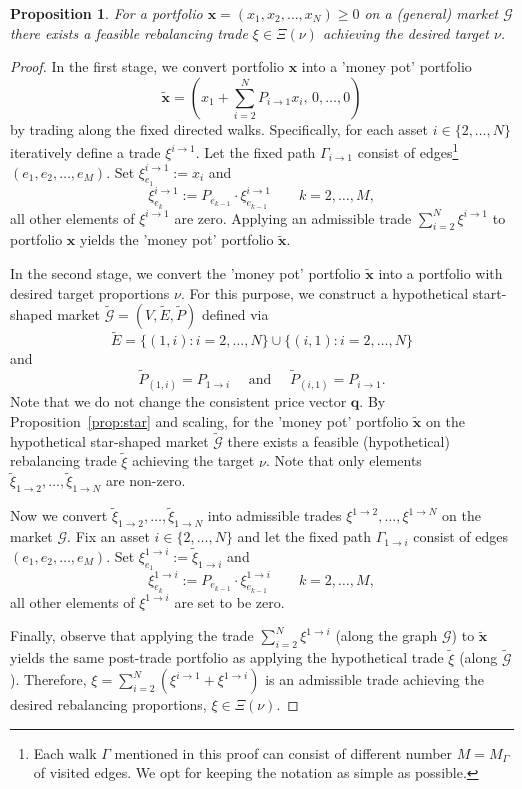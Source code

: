\documentclass{article}
\newtheorem{proposition}[theorem]{Proposition}
\theoremstyle{definition}
\def\bx{\mathbf{x}}
\def\bq{\mathbf{q}}
\begin{document}
\begin{proposition}\label{prop:existence}
For a portfolio $\bx = (x_1, x_2, \dots, x_N) \geq 0$ on a (general) market $\mathcal{G}$ there exists a feasible rebalancing trade $\xi \in \Xi(\nu)$ achieving the desired target $\nu$.
\end{proposition}
\begin{proof}
In the first stage, we convert portfolio $\bx$ into a 'money pot' portfolio
\[
\tilde{\bx} = \left( x_1 + \sum_{i=2}^N  P_{i \to 1} x_i, \, 0, \dots, 0 \right)
\]
by trading along the fixed directed walks. Specifically, for each asset $i \in \{2, \dots, N\}$ iteratively define a trade $\xi^{i \to 1}$.  Let the fixed path $\Gamma_{i \to 1}$ consist of edges\footnote{Each walk $\Gamma$ mentioned in this proof can consist of different number $M = M_\Gamma$ of visited edges. We opt for keeping the notation as simple as possible.} $(e_1, e_2, \dots, e_M)$. Set $\xi^{i \to 1}_{e_1} := x_i$ and 
\[
\xi^{i \to 1}_{e_k} := P_{e_{k-1}} \cdot \xi^{i \to 1}_{e_{k-1}} \quad \quad k = 2, \dots, M,
\]
all other elements of $\xi^{i \to 1}$ are zero. Applying an admissible trade $\sum_{i=2}^N \xi^{i \to 1}$ to portfolio $\bx$ yields the 'money pot' portfolio $\tilde{\bx}$.

In the second stage, we convert the 'money pot' portfolio $\tilde{\bx}$ into a portfolio with desired target proportions $\nu$. For this purpose, we construct a hypothetical start-shaped market $\tilde{\mathcal{G}} = (V, \tilde{E}, \tilde{P})$ defined via
\[
\tilde{E} = \{ (1, i) : i = 2, \dots, N\} \cup \{ (i, 1) : i = 2, \dots, N\}
\]
and 
\[
\tilde{P}_{(1, i)} = P_{1 \to i} \quad \text{ and } \quad \tilde{P}_{(i,1)} = P_{i \to 1}.
\]
Note that we do not change the consistent price vector $\bq$. By Proposition~\ref{prop:star} and scaling, for the 'money pot' portfolio $\tilde{\bx}$ on the hypothetical star-shaped market $\tilde{\mathcal{G}}$ there exists a feasible (hypothetical) rebalancing trade $\tilde{\xi}$ achieving the target $\nu$. Note that only elements $\tilde{\xi}_{1 \to 2}, \dots, \tilde{\xi}_{1 \to N}$ are non-zero.

Now we convert $\tilde{\xi}_{1 \to 2}, \dots, \tilde{\xi}_{1 \to N}$ into admissible trades $\xi^{1 \to 2}, \dots, \xi^{1 \to N}$ on the market $\mathcal{G}$. Fix an asset $i \in \{2, \dots, N\}$ and let the fixed path $\Gamma_{1 \to i}$ consist of edges $(e_1, e_2, \dots, e_M)$. Set $\xi^{1 \to i}_{e_1} := \tilde{\xi}_{1 \to i}$ and 
\[
\xi^{1 \to i}_{e_k} :=  P_{e_{k-1}} \cdot \xi^{1 \to i}_{e_{k-1}} \quad \quad k = 2, \dots, M,
\]
all other elements of $\xi^{1 \to i}$ are set to be zero.

Finally, observe that applying the trade $\sum_{i=2}^N \xi^{1 \to i}$ (along the graph $\mathcal{G}$) to $\tilde{\bx}$ yields the same post-trade portfolio as applying the hypothetical trade $\tilde{\xi}$ (along $\tilde{\mathcal{G}}$). Therefore, $\xi = \sum_{i = 2}^N (\xi^{i \to 1} + \xi^{1 \to i})$ is an admissible trade achieving the desired rebalancing proportions, $\xi \in \Xi(\nu)$.
\end{proof}
\end{document}
